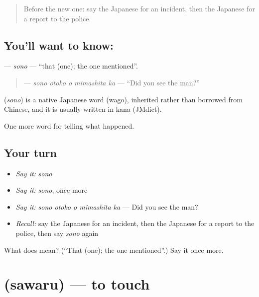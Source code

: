 \begin{quote}
Before the new one: say the Japanese for an incident, then the Japanese for a report to the police.
\end{quote}

\subsection*{You'll want to know: }
\textbf{} — \emph{sono} — \textquotedblleft{}that (one); the one mentioned\textquotedblright{}.

\begin{quote}
\textbf{  } — \emph{sono otoko o mimashita ka} — \textquotedblleft{}Did you see the man?\textquotedblright{}
\end{quote}

\begin{cousinweb}
\textbf{} (\emph{sono}) is a native Japanese word (wago), inherited rather than borrowed from Chinese, and it is usually written in kana (JMdict).
\end{cousinweb}

\begin{grammarlens}[title={What you've built}]
One more word for telling what happened.
\end{grammarlens}

\subsection*{Your turn}
\begin{itemize}
\raggedright
  \item \emph{Say it:} \emph{sono}
  \item \emph{Say it:} \emph{sono}, once more
  \item \emph{Say it:} \emph{sono otoko o mimashita ka} — Did you see the man?
  \item \emph{Recall:} say the Japanese for an incident, then the Japanese for a report to the police, then say \emph{sono} again
\end{itemize}

\begin{tcolorbox}[breakable,colback=teal!4,colframe=teal!35!black,title={Before you move on}]
What does  mean? (\textquotedblleft{}That (one); the one mentioned\textquotedblright{}.) Say it once more.
\end{tcolorbox}
\section[\texorpdfstring{\ja{さわる} (sawaru)}{さわる (sawaru)}]{ (sawaru) — to touch}

